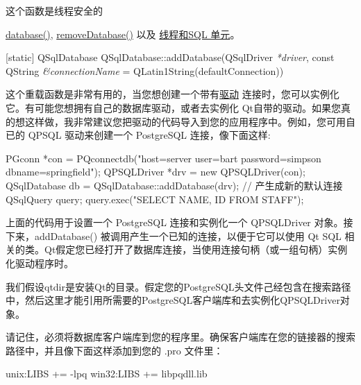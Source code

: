\begin{notice}
这个函数是线程安全的
\end{notice}


\begin{seeAlso}
\href{https://github.com/QtDocumentCN/QtDocumentCN/blob/master/Src/S/QSqlDatabase/QSqlDatabase.md#static-qsqldatabase-qsqldatabasedatabaseconst-qstring-connectionname--qlatin1stringdefaultconnection-bool-open--true}{database()}, \href{https://github.com/QtDocumentCN/QtDocumentCN/blob/master/Src/S/QSqlDatabase/QSqlDatabase.md#static-void-qsqldatabaseremovedatabaseconst-qstring-connectionname}{removeDatabase()} 以及 \href{https://doc.qt.io/qt-5/threads-modules.html#threads-and-the-sql-module}{ 线程和SQL 单元}。
\end{seeAlso}


[static] QSqlDatabase QSqlDatabase::addDatabase(QSqlDriver \emph{*driver}, const QString \emph{\&connectionName} = QLatin1String(defaultConnection))

这个重载函数是非常有用的，当您想创建一个带有\href{https://doc.qt.io/qt-5/qsqldriver.html}{驱动} 连接时，您可以实例化它。有可能您想拥有自己的数据库驱动，或者去实例化 Qt自带的驱动。如果您真的想这样做，我非常建议您把驱动的代码导入到您的应用程序中。例如，您可用自已的 QPSQL 驱动来创建一个 PostgreSQL 连接，像下面这样:

\begin{cppcode}
PGconn *con = PQconnectdb("host=server user=bart password=simpson dbname=springfield");
QPSQLDriver *drv = new QPSQLDriver(con);
QSqlDatabase db = QSqlDatabase::addDatabase(drv); // 产生成新的默认连接
QSqlQuery query;
query.exec("SELECT NAME, ID FROM STAFF");	
\end{cppcode}

上面的代码用于设置一个 PostgreSQL 连接和实例化一个 QPSQLDriver 对象。接下来，addDatabase() 被调用产生一个已知的连接，以便于它可以使用 Qt SQL 相关的类。Qt假定您已经打开了数据库连接，当使用连接句柄（或一组句柄）实例化驱动程序时。

\begin{notice}
我们假设qtdir是安装Qt的目录。假定您的PostgreSQL头文件己经包含在搜索路径中，然后这里才能引用所需要的PostgreSQL客户端库和去实例化QPSQLDriver对象。
\end{notice}



请记住，必须将数据库客户端库到您的程序里。确保客户端库在您的链接器的搜索路径中，并且像下面这样添加到您的 .pro 文件里：

\begin{cppcode}
unix:LIBS += -lpq
win32:LIBS += libpqdll.lib
\end{cppcode}

